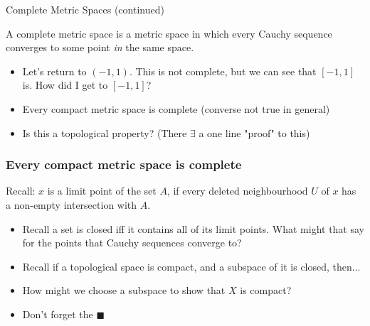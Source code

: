 \documentclass[compress, red]{beamer}
\begin{document}
    \begin{frame}{Complete Metric Spaces (continued)}
        \begin{definition}
            A \alert{complete} metric space is a metric space in which every Cauchy sequence converges to some point \textit{in} the same space.
        \end{definition}
        \begin{itemize}
            \item<2-> Let's return to $(-1,1)$. This is not complete, but we can see that $[-1,1]$ is. How did I get to $[-1,1]$?
            \item<3-> Every compact metric space is complete (converse not true in general)
            \item<4-> Is this a topological property? (There $\exists$ a one line "proof" to this)
        \end{itemize}
    \end{frame}

    \begin{frame}
        \frametitle{Every compact metric space is complete}
        Recall:
            $x$ is a limit point of the set $A$, if every deleted neighbourhood $U$ of $x$ has a non-empty intersection with $A$.
        \begin{itemize}
            \item<2-> Recall a set is closed iff it contains all of its limit points. What might that say for the points that Cauchy sequences 
                converge to?
            \item<3-> Recall if a topological space is compact, and a subspace of it is closed, then...
            \item<4-> How might we choose a subspace to show that $X$ is compact?
            \item<5-> Don't forget the $\blacksquare$
        \end{itemize}
    \end{frame}
\end{document}
